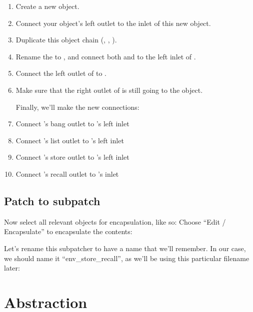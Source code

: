 \begin{enumerate}
\item Create a new  object.
\item Connect your  object's left outlet to the inlet of this new  object.
\item Duplicate this object chain (, , ).
\item Rename the  to , and connect both  and  to the left inlet of .
\item Connect the left outlet of  to .
\item Make sure that the right outlet of  is still going to the  object.

Finally, we'll make the new  connections: 

\item Connect 's bang outlet to 's left inlet
\item Connect 's list outlet to 's left inlet
\item Connect 's store outlet to 's left inlet
\item Connect 's recall outlet to 's inlet
\end{enumerate}

\subsection{Patch to subpatch}\label{patch to subpatch}

Now select all relevant objects for encapsulation, like so:
Choose ``Edit / Encapsulate'' to encapsulate the contents:

Let's rename this subpatcher to have a name that we'll remember.  In our case, we should name it ``env\_store\_recall'', as we'll be using this particular filename later:

\section{Abstraction}\label{abstraction}

